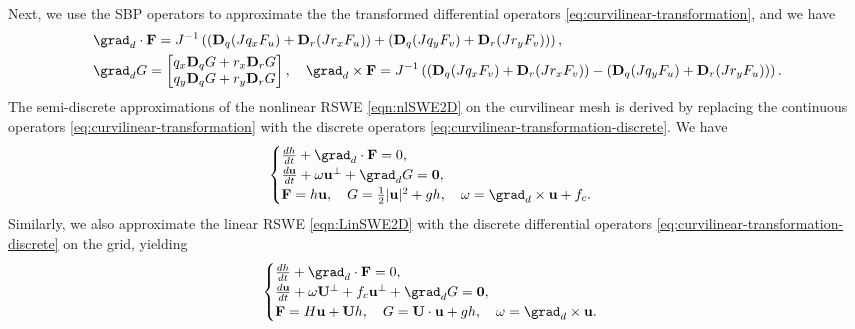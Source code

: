 \documentclass{article}
\numberwithin{equation}{section}
\theoremstyle{definition}
\begin{document}
Next, we use the SBP operators to approximate the the transformed differential operators \eqref{eq:curvilinear-transformation}, and we have  
{\footnotesize
\begin{equation}\label{eq:curvilinear-transformation-discrete}
\begin{split} 
&\grad_d\cdot{\mathbf{F}}  = {J}^{-1} \left(\left(\mathbf{D}_q(Jq_x F_u) + \mathbf{D}_r(Jr_x F_u)\right) +   \left(\mathbf{D}_q(Jq_y F_v) + \mathbf{D}_r(Jr_y F_v)\right)\right),\\
&\grad_d{G} = 
\begin{bmatrix}
    q_x \mathbf{D}_qG + r_x\mathbf{D}_rG\\
    q_y \mathbf{D}_qG + r_y\mathbf{D}_rG
\end{bmatrix},
\quad
\grad_d\times{\mathbf{F}}  = {J}^{-1}\left( \left(\mathbf{D}_q(Jq_x F_v) + \mathbf{D}_r(Jr_xF_v)\right) -  \left(\mathbf{D}_q(Jq_y F_u) + \mathbf{D}_r(Jr_yF_u)\right)\right).
\end{split}
\end{equation}
}
The semi-discrete approximations of the nonlinear  RSWE \eqref{eqn:nlSWE2D} on the curvilinear mesh is derived by replacing the continuous operators \eqref{eq:curvilinear-transformation} with the discrete operators \eqref{eq:curvilinear-transformation-discrete}. We have
\begin{equation}\label{eqn:nlSWE2D-semi-discrete}
    \begin{cases}
    \frac{d h}{d t } + \grad_d\cdot{\mathbf{F}} = 0, \\
    \frac{d \mathbf{u}}{d t} + \omega \mathbf{u}^\perp +  \grad_d{G} = \mathbf{0},\\
    \mathbf{F}=h\mathbf{u}, \quad G = \frac{{1 }}{{2}}|\mathbf{u}|^2 +gh, \quad \omega = \grad_d\times{\mathbf{u}} + f_c.\end{cases}
\end{equation}
Similarly, we also approximate the linear  RSWE \eqref{eqn:LinSWE2D} with the discrete differential operators   \eqref{eq:curvilinear-transformation-discrete} on the grid, yielding 
\begin{equation}\label{eqn:LinSWE2D-semi-discrete}
    \begin{cases}
    \frac{d h}{d t } + \grad_d\cdot{\mathbf{F}} = 0, \\
    \frac{d \mathbf{u}}{d t} + \omega \mathbf{U}^\perp + f_c \mathbf{u}^\perp + \grad_d{G} = \mathbf{0},\\
     \mathbf{F}= H\mathbf{u} + \mathbf{U}h, \quad G = \mathbf{U}\cdot\mathbf{u} +gh, \quad\omega =  \grad_d\times{\mathbf{u}}.
    \end{cases}
\end{equation}
\end{document}
